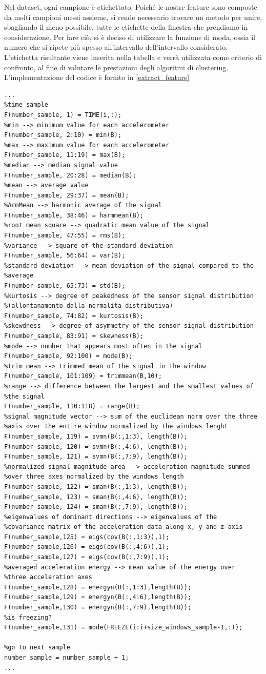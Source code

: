 Nel dataset, ogni campione è etichettato. Poiché le nostre feature sono composte da molti campioni messi assieme, si rende necessario trovare un metodo per unire, sbagliando il meno possibile, tutte le etichette della finestra che prendiamo in considerazione. Per fare ciò, si è deciso di utilizzare la funzione di moda, ossia il numero che si ripete più spesso all'intervallo dell'intervallo considerato. L'etichetta risultante viene inserita nella tabella e verrà utilizzata come criterio di confronto, al fine di valutare le prestazioni degli algoritmi di clustering. L'implementazione del codice è fornito in \ref{extract_feature}
\begin{lstlisting}[style=Matlab-editor,frame=single, caption=Calcolo delle Feature, label=extract_feature]  % Start your code-block
...
%time sample
F(number_sample, 1) = TIME(i,:);
%min --> minimum value for each accelerometer
F(number_sample, 2:10) = min(B);
%max --> maximum value for each accelerometer
F(number_sample, 11:19) = max(B);
%median --> median signal value
F(number_sample, 20:28) = median(B);
%mean --> average value
F(number_sample, 29:37) = mean(B);
%ArmMean --> harmonic average of the signal
F(number_sample, 38:46) = harmmean(B);
%root mean square --> quadratic mean value of the signal
F(number_sample, 47:55) = rms(B);
%variance --> square of the standard deviation
F(number_sample, 56:64) = var(B);
%standard deviation --> mean deviation of the signal compared to the
%average
F(number_sample, 65:73) = std(B);
%kurtosis --> degree of peakedness of the sensor signal distribution
%(allontanamento dalla normalita distributiva)
F(number_sample, 74:82) = kurtosis(B);
%skewdness --> degree of asymmetry of the sensor signal distribution
F(number_sample, 83:91) = skewness(B);
%mode --> number that appears most often in the signal
F(number_sample, 92:100) = mode(B);
%trim mean --> trimmed mean of the signal in the window
F(number_sample, 101:109) = trimmean(B,10);
%range --> difference between the largest and the smallest values of
%the signal
F(number_sample, 110:118) = range(B);
%signal magnitude vector --> sum of the euclidean norm over the three
%axis over the entire window normalized by the windows lenght
F(number_sample, 119) = svmn(B(:,1:3), length(B));
F(number_sample, 120) = svmn(B(:,4:6), length(B));
F(number_sample, 121) = svmn(B(:,7:9), length(B));
%normalized signal magnitude area --> acceleration magnitude summed
%over three axes normalized by the windows length
F(number_sample, 122) = sman(B(:,1:3), length(B));
F(number_sample, 123) = sman(B(:,4:6), length(B));
F(number_sample, 124) = sman(B(:,7:9), length(B));
%eigenvalues of dominant directions --> eigenvalues of the
%covariance matrix of the acceleration data along x, y and z axis
F(number_sample,125) = eigs(cov(B(:,1:3)),1);
F(number_sample,126) = eigs(cov(B(:,4:6)),1);
F(number_sample,127) = eigs(cov(B(:,7:9)),1);
%averaged acceleration energy --> mean value of the energy over
%three acceleration axes
F(number_sample,128) = energyn(B(:,1:3),length(B));
F(number_sample,129) = energyn(B(:,4:6),length(B));
F(number_sample,130) = energyn(B(:,7:9),length(B));
%is freezing?
F(number_sample,131) = mode(FREEZE(i:i+size_windows_sample-1,:));

%go to next sample
number_sample = number_sample + 1;
...
\end{lstlisting}
